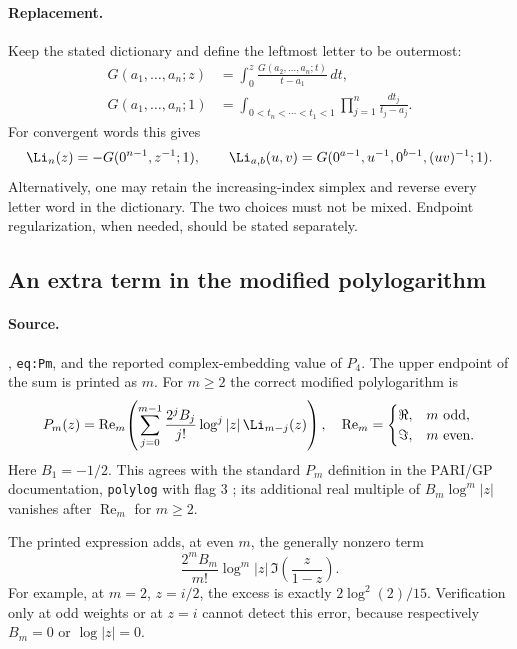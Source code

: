\paragraph{Replacement.}
Keep the stated dictionary and define the leftmost letter to be outermost:
\begin{align*}
 G(a_1,\ldots,a_n;z)
   &=\int_0^z\frac{G(a_2,\ldots,a_n;t)}{t-a_1}\,dt,\\
 G(a_1,\ldots,a_n;1)
   &=\int_{0<t_n<\cdots<t_1<1}
            \prod_{j=1}^n\frac{dt_j}{t_j-a_j}.
\end{align*}
For convergent words this gives
\[
 \Li_n(z)=-G(0^{n-1},z^{-1};1),\qquad
 \Li_{a,b}(u,v)=G(0^{a-1},u^{-1},0^{b-1},(uv)^{-1};1).
\]
Alternatively, one may retain the increasing-index simplex and reverse
every letter word in the dictionary. The two choices must not be mixed.
Endpoint regularization, when needed, should be stated separately.

\subsection{An extra term in the modified polylogarithm}
\label{audit:poly:modified}

\paragraph{Source.}
,
\texttt{eq:Pm}, and the reported complex-embedding value of $P_4$.
The upper endpoint of the sum is printed as $m$. For $m\geq2$ the correct
modified polylogarithm is
\begin{equation}\label{audit:poly:correct-P}
 P_m(z)=\operatorname{Re}_m\!\left(
       \sum_{j=0}^{m-1}\frac{2^jB_j}{j!}
          \log^j|z|\,\Li_{m-j}(z)\right),
 \quad
 \operatorname{Re}_m=
 \begin{cases}\Re,&m\ \text{odd},\\\Im,&m\ \text{even}.
 \end{cases}
\end{equation}
Here $B_1=-1/2$. This agrees with the standard $P_m$ definition in the
PARI/GP documentation, \texttt{polylog} with flag $3$
\cite{audit-pari-polylog}; its additional real multiple of
$B_m\log^m|z|$ vanishes after $\operatorname{Re}_m$ for $m\geq2$.

The printed expression adds, at even $m$, the generally nonzero term
\begin{equation}\label{audit:poly:P-error}
 \frac{2^mB_m}{m!}\log^m|z|\,
             \Im\!\left(\frac{z}{1-z}\right).
\end{equation}
For example, at $m=2$, $z=i/2$, the excess is exactly
$2\log^2(2)/15$. Verification only at odd weights or at $z=i$ cannot
detect this error, because respectively $B_m=0$ or $\log|z|=0$.

